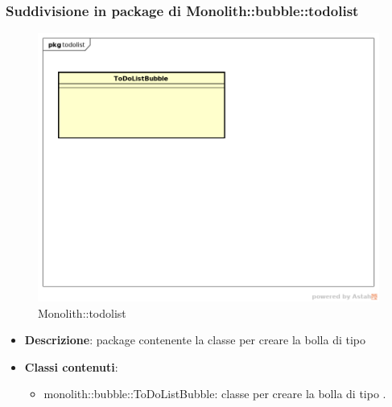 \subsubsection{Suddivisione in package  di Monolith::bubble::todolist}
\label{Monolith::bubble::todolist}
\begin{figure}[H]
	\centering
	\includegraphics[scale=0.5]{Sezioni/imgPackage/bubble_todolist.png}
	\caption{Monolith::todolist}
\end{figure}
\begin{itemize}
	\item{\textbf{Descrizione}}: package contenente la classe per creare la bolla di tipo 
	\item{\textbf{Classi contenuti}}:
	\begin{itemize}
	\item{monolith::bubble::ToDoListBubble}: classe per creare la bolla di tipo .
	\end{itemize}
\end{itemize}

